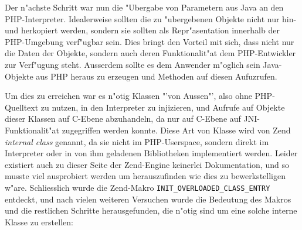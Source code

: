 Der n"achste Schritt war nun die "Ubergabe von Parametern aus Java an den PHP-Interpreter. Idealerweise sollten die zu "ubergebenen
Objekte nicht nur hin- und herkopiert werden, sondern sie sollten als Repr"asentation innerhalb der PHP-Umgebung verf"ugbar sein.
Dies bringt den Vorteil mit sich, dass nicht nur die Daten der Objekte, sondern auch deren Funktionalit"at dem PHP-Entwickler zur
Verf"ugung steht. Ausserdem sollte es dem Anwender m"oglich sein Java-Objekte aus PHP heraus zu erzeugen und Methoden auf diesen
Aufuzrufen.

Um dies zu erreichen war es n"otig Klassen "'von Aussen"', also ohne PHP-Quelltext zu nutzen, in den Interpreter zu injizieren,
und Aufrufe auf Objekte dieser Klassen auf C-Ebene abzuhandeln, da nur auf C-Ebene auf JNI-Funktionalit"at zugegriffen werden konnte. 
Diese Art von Klasse wird von Zend \emph{internal class} genannt, da sie nicht im PHP-Userspace, sondern direkt im Interpreter oder in von
ihm geladenen Bibliotheken implementiert werden.
Leider existiert auch zu dieser Seite der Zend-Engine keinerlei Dokumentation, und so musste viel ausprobiert werden um
herauszufinden wie dies zu bewerkstelligen w"are. Schliesslich wurde die Zend-Makro \texttt{INIT\_OVERLOADED\_CLASS\_ENTRY} entdeckt,
und nach vielen weiteren Versuchen wurde die Bedeutung des Makros und die restlichen Schritte herausgefunden, die n"otig
sind um eine solche interne Klasse zu erstellen:

